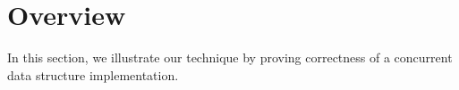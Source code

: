 \section{Overview}
\label{sec:overview}

In this section, we illustrate our technique by proving correctness of
a concurrent data structure implementation.


